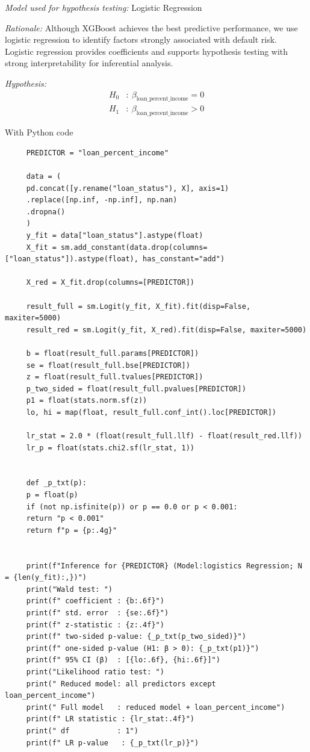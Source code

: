 \documentclass[letterpaper]{article}
\begin{document}
		\emph{Model used for hypothesis testing:} Logistic Regression
		
		\emph{Rationale:} Although XGBoost achieves the best predictive performance, we use logistic regression to identify factors strongly associated with default risk. Logistic regression provides coefficients and supports hypothesis testing with strong interpretability for inferential analysis.
		
		\emph{Hypothesis:}
		\begin{align*}
			H_0 &: \ \beta_{\text{loan\_percent\_income}} = 0 \\
			H_1 &: \ \beta_{\text{loan\_percent\_income}} > 0
		\end{align*}
		
		
		With Python code
		
\begin{lstlisting}
     PREDICTOR = "loan_percent_income"
     
     data = (
     pd.concat([y.rename("loan_status"), X], axis=1)
     .replace([np.inf, -np.inf], np.nan)
     .dropna()
     )
     y_fit = data["loan_status"].astype(float)
     X_fit = sm.add_constant(data.drop(columns=["loan_status"]).astype(float), has_constant="add")
     
     X_red = X_fit.drop(columns=[PREDICTOR])
     
     result_full = sm.Logit(y_fit, X_fit).fit(disp=False, maxiter=5000)
     result_red = sm.Logit(y_fit, X_red).fit(disp=False, maxiter=5000)
     
     b = float(result_full.params[PREDICTOR])
     se = float(result_full.bse[PREDICTOR])
     z = float(result_full.tvalues[PREDICTOR])
     p_two_sided = float(result_full.pvalues[PREDICTOR])
     p1 = float(stats.norm.sf(z))
     lo, hi = map(float, result_full.conf_int().loc[PREDICTOR])
     
     lr_stat = 2.0 * (float(result_full.llf) - float(result_red.llf))
     lr_p = float(stats.chi2.sf(lr_stat, 1))
     
     
     def _p_txt(p):
     p = float(p)
     if (not np.isfinite(p)) or p == 0.0 or p < 0.001:
     return "p < 0.001"
     return f"p = {p:.4g}"
     
     
     print(f"Inference for {PREDICTOR} (Model:logistics Regression; N = {len(y_fit):,})")
     print("Wald test: ")
     print(f" coefficient : {b:.6f}")
     print(f" std. error  : {se:.6f}")
     print(f" z-statistic : {z:.4f}")
     print(f" two-sided p-value: {_p_txt(p_two_sided)}")
     print(f" one-sided p-value (H1: β > 0): {_p_txt(p1)}")
     print(f" 95% CI (β)  : [{lo:.6f}, {hi:.6f}]")
     print("Likelihood ratio test: ")
     print(" Reduced model: all predictors except loan_percent_income")
     print(" Full model   : reduced model + loan_percent_income")
     print(f" LR statistic : {lr_stat:.4f}")
     print(" df           : 1")
     print(f" LR p-value   : {_p_txt(lr_p)}")
\end{lstlisting}
\end{document}
